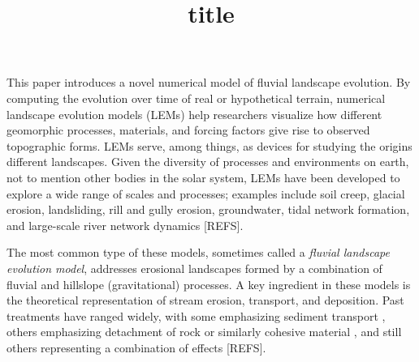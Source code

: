 \documentclass[journal abbreviation, manuscript]{copernicus}
\begin{document}
\title{title}










\maketitle




\begin{abstract}

\end{abstract}

\introduction

This paper introduces a novel numerical model of fluvial landscape evolution. By computing the evolution over time of real or hypothetical terrain, numerical landscape evolution models (LEMs) help researchers visualize how different geomorphic processes, materials, and forcing factors give rise to observed topographic forms. LEMs serve, among things, as devices for studying the origins different landscapes. Given the diversity of processes and environments on earth, not to mention other bodies in the solar system, LEMs have been developed to explore a wide range of scales and processes; examples include soil creep, glacial erosion, landsliding, rill and gully erosion, groundwater, tidal network formation, and large-scale river network dynamics [REFS].

The most common type of these models, sometimes called a \textit{fluvial landscape evolution model}, addresses erosional landscapes formed by a combination of fluvial and hillslope (gravitational) processes. A key ingredient in these models is the theoretical representation of stream erosion, transport, and deposition. Past treatments have ranged widely, with some emphasizing sediment transport \citep[e.g.,][]{willgoose1991coupled}, others emphasizing detachment of rock or similarly cohesive material \citep[e.g.,][]{howard1994detachment}, and still others representing a combination of effects [REFS]. 
\end{document}
